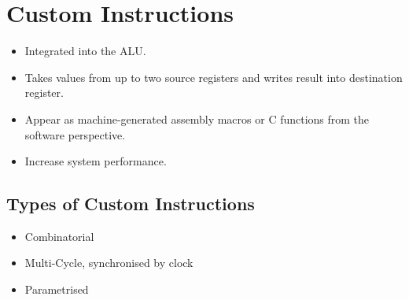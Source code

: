 \section{Custom Instructions }

	\begin{itemize}
	  \item Integrated into the ALU.
	  \item Takes values from up to two source registers and writes result into destination register.
	  \item Appear as machine-generated assembly macros or C functions from the software perspective.
	  \item Increase system performance.
	\end{itemize}
		
	\subsection{Types of Custom Instructions}
	
	\begin{itemize}
	  \item Combinatorial
	  \item Multi-Cycle, synchronised by clock
	  \item Parametrised
	\end{itemize}
	